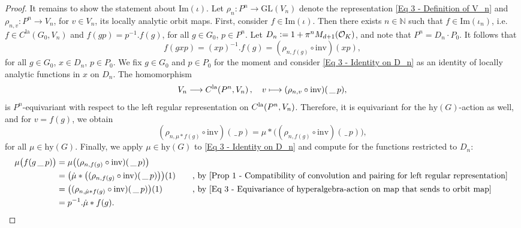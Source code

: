 \documentclass[a4paper, reqno, 10pt]{amsart}
\theoremstyle{definition}
\numberwithin{equation}{section}
\newcommand{\blank}{{\,\_\,}}
\newcommand{\defeq}{\vcentcolon=}
\newcommand{\GL}{{\mathrm{GL}}}
\newcommand{\hy}{{\mathrm{hy}}}
\renewcommand{\Im}{{\mathrm{Im}}}
\newcommand{\inv}{{\mathrm{inv}}}
\newcommand{\la}{{\mathrm{la}}}
\newcommand{\lra}{\longrightarrow}
\newcommand{\lto}{\longmapsto}
\newcommand{\ra}{\rightarrow}
\newcommand{\BN}{{\mathbb {N}}}
\newcommand{\CO}{{\mathcal {O}}}
\newcommand{\unif}{{\pi}}
\begin{document}
\begin{proof}
	
	It remains to show the statement about $\Im(\iota)$.
	Let $\rho_n \colon P^n \ra \GL(V_n)$ denote the representation \eqref{Eq 3 - Definition of V_n} and $\rho_{n,v} \colon P^n \ra V_n$, for $v\in V_n$, its locally analytic orbit maps.
	First, consider $f \in \Im(\iota)$.
	Then there exists $n\in \BN$ such that $f\in \Im(\iota_n)$, i.e.\ $f \in C^\la (G_0,V_n)$ and $f(gp)= p^{-1}.f(g)$, for all $g\in G_0$, $p\in P^n$.
	Let $D_n \defeq 1 + \unif^n M_{d+1}(\CO_K)$, and note that $P^n = D_n \cdot P_0$.
	It follows that
	\begin{equation}\label{Eq 3 - Identity on D_n}
		f(gxp)= (xp)^{-1}.f(g) = (\rho_{n,f(g)} \circ \inv)(xp) ,
	\end{equation}
	for all $g\in G_0$, $x\in D_n$, $p\in P_0$.
	We fix $g\in G_0$ and $p\in P_0$ for the moment and consider \eqref{Eq 3 - Identity on D_n} as an identity of locally analytic functions in $x$ on $D_n$.
	The homomorphism
	\begin{align*}
		V_n \lra C^{\rm la}(P^n,V_n) \,,\quad v \lto (\rho_{n,v} \circ \inv )( \blank p) ,
	\end{align*}
	is $P^n$-equivariant with respect to the left regular representation on $C^{\rm la}(P^n,V_n)$.
	Therefore, it is equivariant for the $\hy(G)$-action as well, and for $v = f(g)$, we obtain
	\begin{equation}\label{Eq 3 - Equivariance of hyperalgebra-action on map that sends to orbit map}
		(\rho_{n, \mu \ast f(g)}\circ \inv)(\blank p)= \mu \ast \big( (\rho_{n,f(g)}\circ \inv)( \blank p) \big),
	\end{equation}
	for all $\mu \in \hy(G)$.
	Finally, we apply $\mu \in \hy(G)$ to \eqref{Eq 3 - Identity on D_n} and compute for the functions restricted to $D_n$:
	\begin{equation}\label{Eq 3 - Computation for f and hyperalgebra}
		\begin{aligned}
			\mu \big(f(g\blank p) \big) &= \mu \big( (\rho_{n,f(g)}\circ \inv)(\blank p)\big) && \\
			&= \big( \dot{\mu} \ast \big( (\rho_{n,f(g)}\circ \inv)(\blank p)\big)\big) (1) &&\quad \text{, by \Cref{Prop 1 - Compatibility of convolution and pairing for left regular representation} } \\
			&= \big( (\rho_{n, \dot{\mu} \ast f(g)}\circ \inv)(\blank p) \big)(1) &&\quad \text{, by \eqref{Eq 3 - Equivariance of hyperalgebra-action on map that sends to orbit map}} \\
			&= p^{-1}.\dot{\mu} \ast f(g) . &&
		\end{aligned}
	\end{equation}
	

\end{proof}
\end{document}
